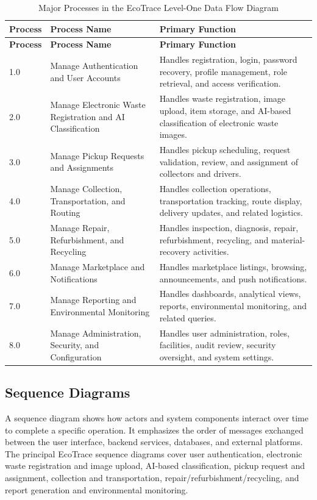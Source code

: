 \begin{longtable}{@{}p{1.4cm}p{4.4cm}p{6.6cm}@{}}
\caption{Major Processes in the EcoTrace Level-One Data Flow Diagram} \label{tab:level1-dfd} \\
\toprule \textbf{Process} & \textbf{Process Name} & \textbf{Primary Function} \\ \midrule
\endfirsthead
\toprule \textbf{Process} & \textbf{Process Name} & \textbf{Primary Function} \\ \midrule
\endhead
1.0 & Manage Authentication and User Accounts & Handles registration, login, password recovery, profile management, role retrieval, and access verification. \\
2.0 & Manage Electronic Waste Registration and AI Classification & Handles waste registration, image upload, item storage, and AI-based classification of electronic waste images. \\
3.0 & Manage Pickup Requests and Assignments & Handles pickup scheduling, request validation, review, and assignment of collectors and drivers. \\
4.0 & Manage Collection, Transportation, and Routing & Handles collection operations, transportation tracking, route display, delivery updates, and related logistics. \\
5.0 & Manage Repair, Refurbishment, and Recycling & Handles inspection, diagnosis, repair, refurbishment, recycling, and material-recovery activities. \\
6.0 & Manage Marketplace and Notifications & Handles marketplace listings, browsing, announcements, and push notifications. \\
7.0 & Manage Reporting and Environmental Monitoring & Handles dashboards, analytical views, reports, environmental monitoring, and related queries. \\
8.0 & Manage Administration, Security, and Configuration & Handles user administration, roles, facilities, audit review, security oversight, and system settings. \\
\bottomrule
\end{longtable}

\subsection{Sequence Diagrams}

A sequence diagram shows how actors and system components interact over
time to complete a specific operation. It emphasizes the order of messages
exchanged between the user interface, backend services, databases, and
external platforms. The principal EcoTrace sequence diagrams cover user
authentication, electronic waste registration and image upload, AI-based
classification, pickup request and assignment, collection and transportation,
repair/refurbishment/recycling, and report generation and environmental
monitoring.

